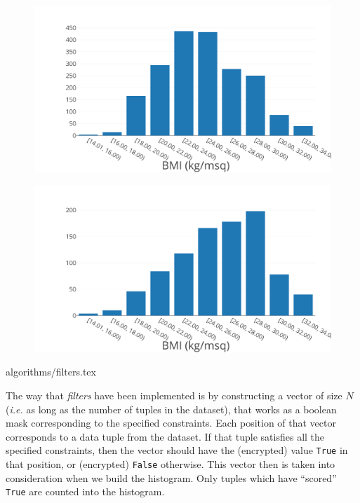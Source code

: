 \begin{figure}
\centering
\begin{minipage}{.5\textwidth}
  \centering
  \includegraphics[width=\columnwidth]{figures/1d_no_filter.png}
  \label{f:1d_no_filter}
\end{minipage}%
\begin{minipage}{.5\textwidth}
  \centering
  \includegraphics[width=\columnwidth]{figures/1d_filter.png}
  \label{f:1d_filter}
\end{minipage}
\end{figure}

{algorithms/filters.tex}

The way that \textit{filters} have been implemented is by constructing a vector of size $N$ (\textit{i.e.} as long as the number of tuples in the dataset), that works as a boolean mask corresponding to the specified constraints.
Each position of that vector corresponds to a data tuple from the dataset.
If that tuple satisfies all the specified constraints, then the vector should have the (encrypted) value \texttt{True} in that position, or (encrypted) \texttt{False} otherwise.
This vector then is taken into consideration when we build the histogram.
Only tuples which have ``scored'' \texttt{True} are counted into the histogram.

